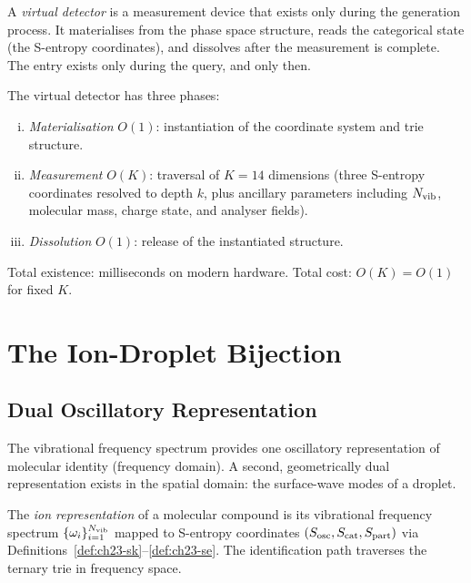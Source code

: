 \begin{definition}
\label{def:ch23-vd}
A \emph{virtual detector} is a measurement device that exists only during
the generation process.  It materialises from the phase space structure,
reads the categorical state (the S-entropy coordinates), and dissolves after
the measurement is complete.  The entry exists only during the query, and
only then.
\end{definition}

\begin{theorem}
\label{thm:ch23-vd-lifecycle}
The virtual detector has three phases:
\begin{enumerate}[(i)]
  \item \emph{Materialisation} $O(1)$: instantiation of the coordinate system
    and trie structure.
  \item \emph{Measurement} $O(K)$: traversal of $K = 14$ dimensions (three
    S-entropy coordinates resolved to depth $k$, plus ancillary parameters
    including $N_{\mathrm{vib}}$, molecular mass, charge state, and analyser fields).
  \item \emph{Dissolution} $O(1)$: release of the instantiated structure.
\end{enumerate}
Total existence: milliseconds on modern hardware.  Total cost: $O(K) = O(1)$
for fixed $K$.
\end{theorem}

\section{The Ion-Droplet Bijection}
\label{sec:ch23-bijection}

\subsection{Dual Oscillatory Representation}
\label{sec:ch23-dual}

The vibrational frequency spectrum provides one oscillatory representation of
molecular identity (frequency domain).  A second, geometrically dual
representation exists in the spatial domain: the surface-wave modes of a droplet.

\begin{definition}
\label{def:ch23-ion-repr}
The \emph{ion representation} of a molecular compound is its vibrational
frequency spectrum $\{\omega_i\}_{i=1}^{N_{\mathrm{vib}}}$ mapped to S-entropy
coordinates $(S_{\mathrm{osc}}, S_{\mathrm{cat}}, S_{\mathrm{part}})$ via Definitions~\ref{def:ch23-sk}--\ref{def:ch23-se}.
The identification path traverses the ternary trie in frequency space.
\end{definition}

